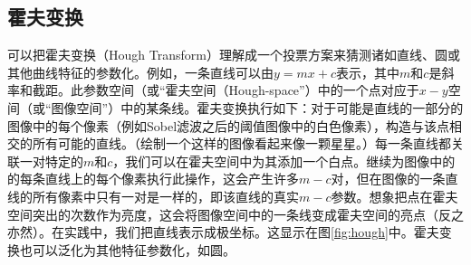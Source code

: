 
\subsection{霍夫变换}
可以把霍夫变换（Hough Transform）理解成一个投票方案来猜测诸如直线、圆或其他曲线特征的参数化\cite{duda1972use}。例如，一条直线可以由$y=mx+c$表示，其中$m$和$c$是斜率和截距。此参数空间（或“霍夫空间（Hough-space”）中的一个点对应于$x-y$空间（或“图像空间”）中的某条线。霍夫变换执行如下：对于可能是直线的一部分的图像中的每个像素（例如Sobel滤波之后的阈值图像中的白色像素），构造与该点相交的所有可能的直线。（绘制一个这样的图像看起来像一颗星星。）每一条直线都关联一对特定的$m$和$c$，我们可以在霍夫空间中为其添加一个白点。继续为图像中的的每条直线上的每个像素执行此操作，这会产生许多$m-c$对，但在图像的一条直线的所有像素中只有一对是一样的，即该直线的真实$m-c$参数。想象把点在霍夫空间突出的次数作为亮度，这会将图像空间中的一条线变成霍夫空间的亮点（反之亦然）。在实践中，我们把直线表示成极坐标。这显示在图\ref{fig:hough}中。霍夫变换也可以泛化为其他特征参数化，如圆。


